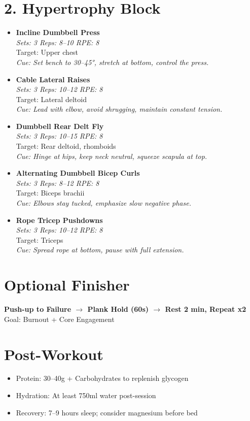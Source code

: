 \documentclass[12pt]{article}
\begin{document}
\vspace{1em}
\section*{2. Hypertrophy Block}

\begin{itemize}[leftmargin=1.5em]
  \item \textbf{Incline Dumbbell Press} \\
    \textit{Sets: 3 \quad Reps: 8--10 \quad RPE: 8} \\
    Target: Upper chest \\
    \textit{Cue: Set bench to 30--45°, stretch at bottom, control the press.}

  \item \textbf{Cable Lateral Raises} \\
    \textit{Sets: 3 \quad Reps: 10--12 \quad RPE: 8} \\
    Target: Lateral deltoid \\
    \textit{Cue: Lead with elbow, avoid shrugging, maintain constant tension.}

  \item \textbf{Dumbbell Rear Delt Fly} \\
    \textit{Sets: 3 \quad Reps: 10--15 \quad RPE: 8} \\
    Target: Rear deltoid, rhomboids \\
    \textit{Cue: Hinge at hips, keep neck neutral, squeeze scapula at top.}

  \item \textbf{Alternating Dumbbell Bicep Curls} \\
    \textit{Sets: 3 \quad Reps: 8--12 \quad RPE: 8} \\
    Target: Biceps brachii \\
    \textit{Cue: Elbows stay tucked, emphasize slow negative phase.}

  \item \textbf{Rope Tricep Pushdowns} \\
    \textit{Sets: 3 \quad Reps: 10--12 \quad RPE: 8} \\
    Target: Triceps \\
    \textit{Cue: Spread rope at bottom, pause with full extension.}
\end{itemize}

\vspace{1em}
\section*{Optional Finisher}
\textbf{Push-up to Failure $\rightarrow$ Plank Hold (60s) $\rightarrow$ Rest 2 min, Repeat x2} \\
Goal: Burnout + Core Engagement

\vspace{1em}
\section*{Post-Workout}
\begin{itemize}[leftmargin=1.5em]
  \item Protein: 30--40g + Carbohydrates to replenish glycogen
  \item Hydration: At least 750ml water post-session
  \item Recovery: 7–9 hours sleep; consider magnesium before bed
\end{itemize}
\end{document}
